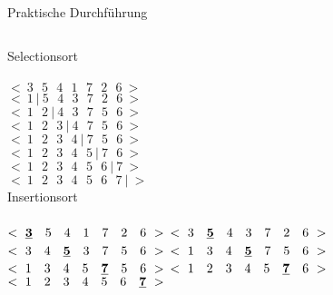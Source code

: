 \begin{frame}{Praktische Durchführung}
	\begin{columns}[t]
		\huge
		Selectionsort \\
		\normalsize
		\ \\
		$ < \ 3 \ \ \ 5 \ \ \  4 \ \ \  1 \ \ \  7 \ \ \  2 \ \ \  6 \ > $ \\
		$ < \ 1 \ | \ 5 \ \ \  4 \ \ \  3 \ \ \  7 \ \ \  2 \ \ \  6 \ >  $ \\
		$ < \ 1 \ \ \  2 \ | \ 4 \ \ \  3 \ \ \  7 \ \ \  5 \ \ \  6 \ >  $  \\
		$ < \ 1 \ \ \ 2 \ \ \  3 \ | \ 4 \ \ \  7 \ \ \  5 \ \ \  6 \ >  $  \\ 
		$ < \ 1 \ \ \  2 \ \ \  3 \ \ \  4 \ | \ 7 \ \ \  5 \ \ \  6 \ >  $ \\
		$ < \ 1 \ \ \  2 \ \ \  3 \ \ \  4 \ \ \  5 \ | \ 7 \ \ \  6 \ >  $ \\
		$ < \ 1 \ \ \  2 \ \ \  3 \ \ \  4 \ \ \  5 \ \ \  6 \ | \  7 \ >  $ \\
		$ < \ 1 \ \ \  2 \ \ \  3 \ \ \  4 \ \ \  5 \ \ \  6 \ \ \  7 \ | \ >   $ \\  
		
		\huge
		Insertionsort \\
		\normalsize
		\ \\
		$ < \ \text{\textbf{\underline{3}}} \ \ \ 5 \ \ \  4 \ \ \  1 \ \ \  7 \ \ \  2 \ \ \  6 \ >  $
		$ < \ 3 \ \ \  \text{\textbf{\underline{5}}} \ \ \  4 \ \ \  3 \ \ \  7 \ \ \  2 \ \ \  6 \ >  $
		$ < \ 3 \ \ \  4 \ \ \  \text{\textbf{\underline{5}}} \ \ \  3 \ \ \  7 \ \ \  5 \ \ \  6 \ >  $  
		$ < \ 1 \ \ \ 3 \ \ \  4 \ \ \  \text{\textbf{\underline{5}}} \ \ \  7 \ \ \  5 \ \ \  6  \ > $ 
		$ < \ 1 \ \ \  3 \ \ \  4 \ \ \  5 \ \ \  \text{\textbf{\underline{7}}} \ \ \  5 \ \ \  6 \ >  $
		$ < \ 1 \ \ \  2 \ \ \  3 \ \ \  4 \ \ \  5 \ \ \  \text{\textbf{\underline{7}}} \ \ \  6 \ >  $
		$ < \ 1 \ \ \  2 \ \ \  3 \ \ \  4 \ \ \  5 \ \ \  6 \ \ \   \text{\textbf{\underline{7}}} \ >  $  
	\end{columns}
\end{frame}


